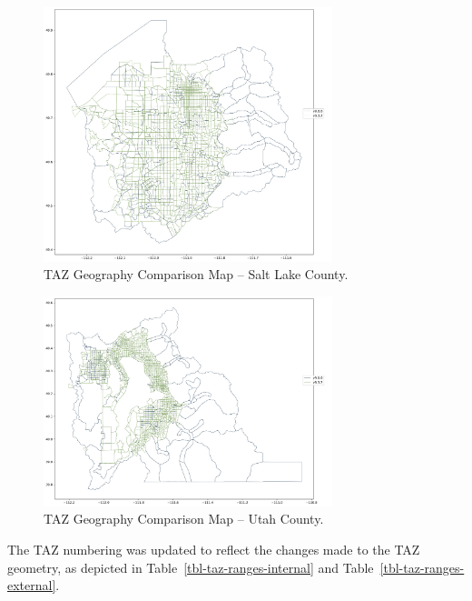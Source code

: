 \documentclass[
  letterpaper,
  DIV=11,
  numbers=noendperiod]{scrreprt}
\begin{document}
\begin{figure}[H]

{\centering \includegraphics[width=0.75\textwidth,height=\textheight]{v9x/v900/whats-new/_pictures/pdf-taz-35.png}

}

\caption{\label{fig-taz-compare-sl-pdf}TAZ Geography Comparison Map --
Salt Lake County.}

\end{figure}

\begin{figure}[H]

{\centering \includegraphics[width=0.75\textwidth,height=\textheight]{v9x/v900/whats-new/_pictures/pdf-taz-49.png}

}

\caption{\label{fig-taz-compare-utah-pdf}TAZ Geography Comparison Map --
Utah County.}

\end{figure}

The TAZ numbering was updated to reflect the changes made to the TAZ
geometry, as depicted in Table~\ref{tbl-taz-ranges-internal} and
Table~\ref{tbl-taz-ranges-external}.
\end{document}
